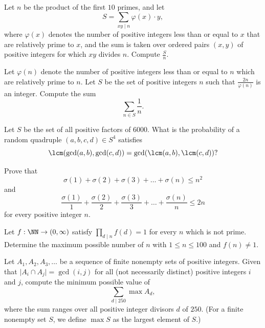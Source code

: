 \documentclass[11pt]{scrartcl}
\begin{document}
\begin{problem} %
    Let $n$ be the product of the first $10$ primes, and let
    \[
        S = \sum_{xy \mid n} \varphi(x) \cdot y,
    \]
    where $\varphi(x)$ denotes the number of positive integers less than or equal to $x$ that are relatively prime to $x$, and the sum is taken over ordered pairs $(x, y)$ of positive integers for which $xy$ divides $n$. Compute $\frac{S}{n}$.
\end{problem}

\begin{problem} %
    Let $\varphi(n)$ denote the number of positive integers less than or equal to $n$ which are relatively prime to $n$. Let $S$ be the set of positive integers $n$ such that $\frac{2n}{\varphi(n)}$ is an integer. Compute the sum
    \[
        \sum_{n \in S} \frac{1}{n}.
    \]
\end{problem}

\begin{problem} %
    Let $S$ be the set of all positive factors of $6000$. What is the probability of a random quadruple $(a, b, c, d) \in S^4$ satisfies
    \[
        \lcm(\gcd(a, b), \gcd(c, d)) = \gcd(\lcm(a, b), \lcm(c, d))?
    \]
\end{problem}

\begin{problem} %
    Prove that
    \[\sigma(1) + \sigma(2) + \sigma(3) + \dots + \sigma(n) \le n^2\]
	and
	\[\frac{\sigma(1)}{1} + \frac{\sigma(2)}{2} + \frac{\sigma(3)}{3} + \dots + \frac{\sigma(n)}{n} \le 2n\]
    for every positive integer $n$.
\end{problem}

\begin{problem}[CMIMC 2020/A8]
	\label{pro:cmimc-2020}
	Let $f : \NN \to (0,\infty)$ satisfy $\prod_{d \mid n}f(d) = 1$ for every $n$ which is not prime. Determine the maximum possible number of $n$ with $1 \le n \le 100$ and $f(n) \neq 1$.
\end{problem}

\begin{problem} %
    Let $A_1, A_2, A_3, \dots$ be a sequence of finite nonempty sets of positive integers. Given that $\lvert A_i \cap A_j \rvert = \gcd(i, j)$ for all (not necessarily distinct) positive integers $i$ and $j$, compute the minimum possible value of
    \[
        \sum_{d \mid 250} \max A_d,
    \]
    where the sum ranges over all positive integer divisors $d$ of $250$. (For a finite nonempty set $S$, we define $\max S$ as the largest element of $S$.)
\end{problem}
\end{document}
